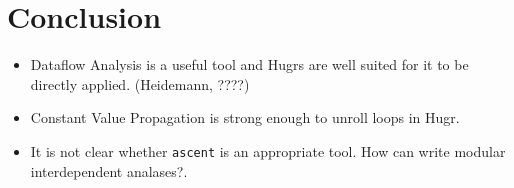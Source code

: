 \documentclass[presentation]{beamer}
\begin{document}
\section{Conclusion}
\label{sec:orgdb585cc}
\begin{itemize}
\item Dataflow Analysis is a useful tool and Hugrs are well suited for it to be
directly applied. (Heidemann, ????)
\item Constant Value Propagation is strong enough to unroll loops in Hugr.
\item It is not clear whether \texttt{ascent} is an appropriate tool. How can write modular interdependent analases?.
\end{itemize}
\end{document}

